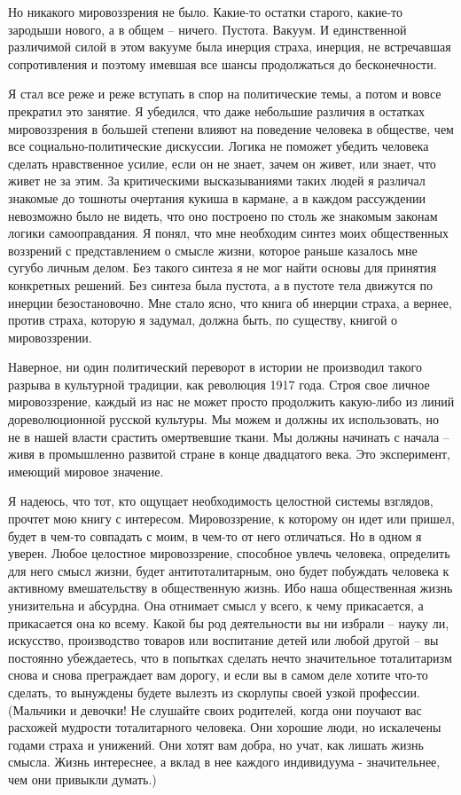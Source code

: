 \documentclass{book}
\begin{document}
{Но никакого мировоззрения не было. Какие-то остатки старого, какие-то зародыши нового, а в общем -- ничего. Пустота. Вакуум. И единственной различимой силой в этом вакууме была инерция страха, инерция, не встречавшая сопротивления и поэтому имевшая все шансы продолжаться до бесконечности.

Я стал все реже и реже вступать в спор на политические те­мы, а потом и вовсе прекратил это занятие. Я убедился, что да­же небольшие различия в остатках мировоззрения в большей степени влияют на поведение человека в обществе, чем все со­циально-политические дискуссии. Логика не поможет убедить человека сделать нравственное усилие, если он не знает, зачем он живет, или знает, что живет не за этим. За критическими вы­сказываниями таких людей я различал знакомые до тошноты очертания кукиша в кармане, а в каждом рассуждении невоз­можно было не видеть, что оно построено по столь же знакомым законам логики самооправдания. Я понял, что мне необходим синтез моих общественных воззрений с представлением о смыс­ле жизни, которое раньше казалось мне сугубо личным делом. Без такого синтеза я не мог найти основы для принятия кон­кретных решений. Без синтеза была пустота, а в пустоте тела движутся по инерции безостановочно. Мне стало ясно, что книга об инерции страха, а вернее, против  страха, которую я задумал, должна 
быть, по существу, книгой о мировоззрении.

Наверное, ни один политический переворот в истории не про­изводил такого разрыва в культурной традиции, как револю­ция 1917 года. Строя свое личное мировоззрение, каждый из нас не может просто продолжить какую-либо из линий дорево­люционной русской культуры. Мы можем и должны их исполь­зовать, но не в нашей власти срастить омертвевшие ткани. Мы должны начинать с начала -- живя в промышленно развитой стране в конце двадцатого века. Это эксперимент, имеющий ми­ровое значение.

Я надеюсь, что тот, кто ощущает необходимость целостной системы взглядов, прочтет мою книгу с интересом. Мировоз­зрение, к которому он идет или пришел, будет в чем-то совпа­дать с моим, в чем-то от него отличаться. Но в одном я уверен. Любое целостное мировоззрение, способное увлечь человека, определить для него смысл жизни, будет антитоталитарным, оно будет побуждать человека к активному вмешательству в общественную жизнь. Ибо наша общественная жизнь унизитель­на и абсурдна. Она отнимает смысл у всего, к чему прикасается, а прикасается она ко всему. Какой бы род деятельности вы ни избрали -- науку ли, искусство, производство товаров или вос­питание детей или любой другой -- вы постоянно убеждаетесь, что в попытках сделать нечто значительное тоталитаризм снова и снова преграждает вам дорогу, и если вы в самом деле хоти­те что-то сделать, то вынуждены будете вылезть из скорлупы своей узкой профессии. (Мальчики и девочки! Не слушайте сво­их родителей, когда они поучают вас расхожей мудрости тота­литарного 
человека. Они хорошие люди, но искалечены годами страха и унижений. Они хотят вам добра, но учат, как лишать жизнь смысла. Жизнь интереснее, а вклад в нее каждого инди­видуума - значительнее, чем они привыкли думать.)

}
\end{document}
